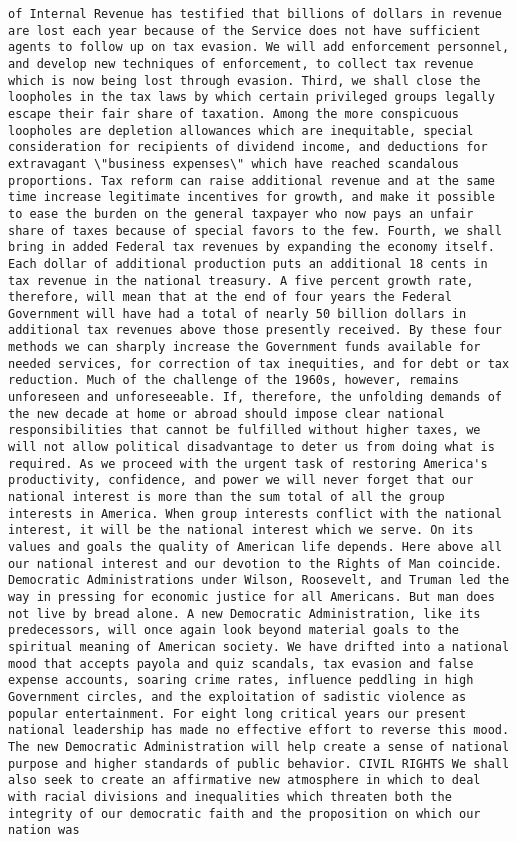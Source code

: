 \documentclass[
]{article}
\begin{document}
\begin{verbatim}
of Internal Revenue has testified that billions of dollars in revenue are lost each year because of the Service does not have sufficient agents to follow up on tax evasion. We will add enforcement personnel, and develop new techniques of enforcement, to collect tax revenue which is now being lost through evasion. Third, we shall close the loopholes in the tax laws by which certain privileged groups legally escape their fair share of taxation. Among the more conspicuous loopholes are depletion allowances which are inequitable, special consideration for recipients of dividend income, and deductions for extravagant \"business expenses\" which have reached scandalous proportions. Tax reform can raise additional revenue and at the same time increase legitimate incentives for growth, and make it possible to ease the burden on the general taxpayer who now pays an unfair share of taxes because of special favors to the few. Fourth, we shall bring in added Federal tax revenues by expanding the economy itself. Each dollar of additional production puts an additional 18 cents in tax revenue in the national treasury. A five percent growth rate, therefore, will mean that at the end of four years the Federal Government will have had a total of nearly 50 billion dollars in additional tax revenues above those presently received. By these four methods we can sharply increase the Government funds available for needed services, for correction of tax inequities, and for debt or tax reduction. Much of the challenge of the 1960s, however, remains unforeseen and unforeseeable. If, therefore, the unfolding demands of the new decade at home or abroad should impose clear national responsibilities that cannot be fulfilled without higher taxes, we will not allow political disadvantage to deter us from doing what is required. As we proceed with the urgent task of restoring America's productivity, confidence, and power we will never forget that our national interest is more than the sum total of all the group interests in America. When group interests conflict with the national interest, it will be the national interest which we serve. On its values and goals the quality of American life depends. Here above all our national interest and our devotion to the Rights of Man coincide. Democratic Administrations under Wilson, Roosevelt, and Truman led the way in pressing for economic justice for all Americans. But man does not live by bread alone. A new Democratic Administration, like its predecessors, will once again look beyond material goals to the spiritual meaning of American society. We have drifted into a national mood that accepts payola and quiz scandals, tax evasion and false expense accounts, soaring crime rates, influence peddling in high Government circles, and the exploitation of sadistic violence as popular entertainment. For eight long critical years our present national leadership has made no effective effort to reverse this mood. The new Democratic Administration will help create a sense of national purpose and higher standards of public behavior. CIVIL RIGHTS We shall also seek to create an affirmative new atmosphere in which to deal with racial divisions and inequalities which threaten both the integrity of our democratic faith and the proposition on which our nation was 
\end{verbatim}
\end{document}
